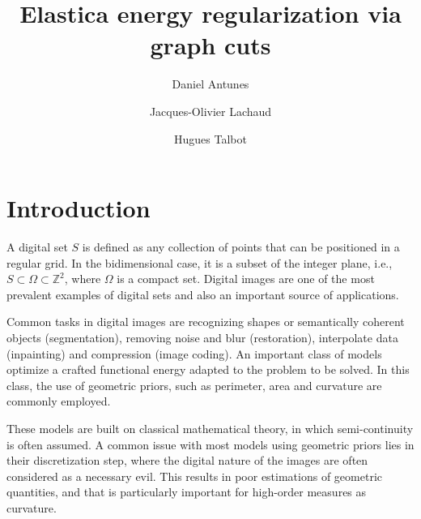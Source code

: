 \documentclass[smallextended]{svjour3}
\begin{document}
%
\title{Elastica energy regularization via graph cuts}
\author{Daniel Antunes%
\and Jacques-Olivier Lachaud %
\and Hugues Talbot}%

\maketitle

\section{Introduction}

A digital set $S$ is defined as any collection of points that can be positioned in a regular grid. In the bidimensional case, it is a subset of the integer plane, i.e., $S \subset \Omega \subset \mathbb{Z}^2$, where $\Omega$ is a compact set. Digital images are one of the most prevalent examples of digital sets and also an important source of applications.

Common tasks in digital images are recognizing shapes or semantically coherent objects (segmentation), removing noise and blur (restoration), interpolate data (inpainting) and compression (image coding). An important class of models optimize a crafted functional energy adapted to the problem to be solved. In this class, the use of geometric priors, such as perimeter, area and curvature are commonly employed.

These models are built on classical mathematical theory, in which semi-continuity is often assumed. A common issue with most models using geometric priors lies in their discretization step, where the digital nature of the images are often considered as a necessary evil. This results in poor estimations of geometric quantities, and that is particularly important for high-order measures as curvature.
\end{document}
